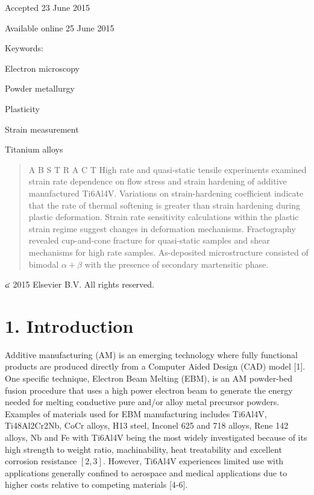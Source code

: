 \documentclass[10pt]{article}
\begin{document}
Accepted 23 June 2015

Available online 25 June 2015

Keywords:

Electron microscopy

Powder metallurgy

Plasticity

Strain measurement

Titanium alloys

\begin{abstract}
A B S T R A C T High rate and quasi-static tensile experiments examined strain rate dependence on flow stress and strain hardening of additive manufactured Ti6Al4V. Variations on strain-hardening coefficient indicate that the rate of thermal softening is greater than strain hardening during plastic deformation. Strain rate sensitivity calculations within the plastic strain regime suggest changes in deformation mechanisms. Fractography revealed cup-and-cone fracture for quasi-static samples and shear mechanisms for high rate samples. As-deposited microstructure consisted of bimodal $\alpha+\beta$ with the presence of secondary martensitic phase.
\end{abstract}

๔ 2015 Elsevier B.V. All rights reserved.

\section*{1. Introduction}
Additive manufacturing (AM) is an emerging technology where fully functional products are produced directly from a Computer Aided Design (CAD) model [1]. One specific technique, Electron Beam Melting (EBM), is an AM powder-bed fusion procedure that uses a high power electron beam to generate the energy needed for melting conductive pure and/or alloy metal precursor powders. Examples of materials used for EBM manufacturing includes Ti6Al4V, Ti48Al2Cr2Nb, CoCr alloys, H13 steel, Inconel 625 and 718 alloys, Rene 142 alloys, $\mathrm{Nb}$ and Fe with Ti6Al4V being the most widely investigated because of its high strength to weight ratio, machinability, heat treatability and excellent corrosion resistance $[2,3]$. However, Ti6Al4V experiences limited use with applications generally confined to aerospace and medical applications due to higher costs relative to competing materials [4-6].
\end{document}
